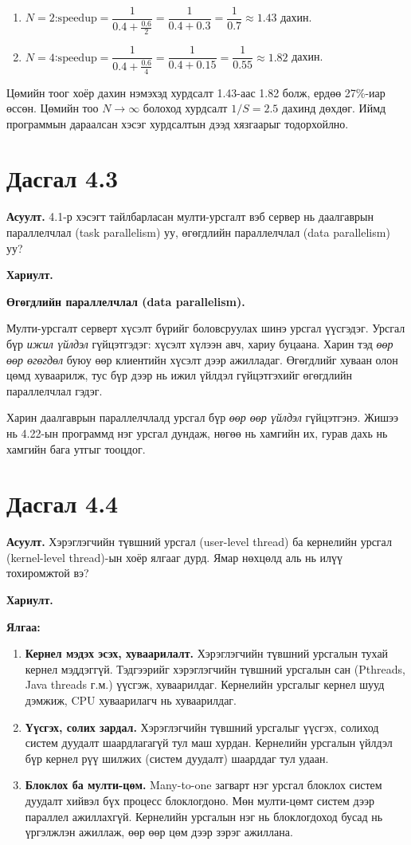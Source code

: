 \documentclass[12pt,a4paper]{article}
\newcommand{\question}[2]{\section{Дасгал #1}\textbf{Асуулт.} #2\par\medskip\textbf{Хариулт.}\par}
\begin{document}
\begin{enumerate}[label=(\alph*), leftmargin=1.5em]
  \item $N = 2$:\quad $\text{speedup} = \dfrac{1}{0.4 + \frac{0.6}{2}} = \dfrac{1}{0.4 + 0.3} = \dfrac{1}{0.7} \approx \mathbf{1.43}$ дахин.
  \item $N = 4$:\quad $\text{speedup} = \dfrac{1}{0.4 + \frac{0.6}{4}} = \dfrac{1}{0.4 + 0.15} = \dfrac{1}{0.55} \approx \mathbf{1.82}$ дахин.
\end{enumerate}

Цөмийн тоог хоёр дахин нэмэхэд хурдсалт 1.43-аас 1.82 болж, ердөө 27\%-иар өссөн. Цөмийн тоо $N \to \infty$ болоход хурдсалт $1/S = 2.5$ дахинд дөхдөг. Иймд программын дараалсан хэсэг хурдсалтын дээд хязгаарыг тодорхойлно.

\question{4.3}{4.1-р хэсэгт тайлбарласан мулти-урсгалт вэб сервер нь даалгаврын параллелчлал (task parallelism) уу, өгөгдлийн параллелчлал (data parallelism) уу?}

\textbf{Өгөгдлийн параллелчлал (data parallelism).}

Мулти-урсгалт серверт хүсэлт бүрийг боловсруулах шинэ урсгал үүсгэдэг. Урсгал бүр \emph{ижил үйлдэл} гүйцэтгэдэг: хүсэлт хүлээн авч, хариу буцаана. Харин тэд \emph{өөр өөр өгөгдөл} буюу өөр клиентийн хүсэлт дээр ажилладаг. Өгөгдлийг хуваан олон цөмд хуваарилж, тус бүр дээр нь ижил үйлдэл гүйцэтгэхийг өгөгдлийн параллелчлал гэдэг.

Харин даалгаврын параллелчлалд урсгал бүр \emph{өөр өөр үйлдэл} гүйцэтгэнэ. Жишээ нь 4.22-ын программд нэг урсгал дундаж, нөгөө нь хамгийн их, гурав дахь нь хамгийн бага утгыг тооцдог.

\question{4.4}{Хэрэглэгчийн түвшний урсгал (user-level thread) ба кернелийн урсгал (kernel-level thread)-ын хоёр ялгааг дурд. Ямар нөхцөлд аль нь илүү тохиромжтой вэ?}

\textbf{Ялгаа:}
\begin{enumerate}[leftmargin=1.5em]
  \item \textbf{Кернел мэдэх эсэх, хуваарилалт.} Хэрэглэгчийн түвшний урсгалын тухай кернел мэддэггүй. Тэдгээрийг хэрэглэгчийн түвшний урсгалын сан (Pthreads, Java threads г.м.) үүсгэж, хуваарилдаг. Кернелийн урсгалыг кернел шууд дэмжиж, CPU хуваарилагч нь хуваарилдаг.
  \item \textbf{Үүсгэх, солих зардал.} Хэрэглэгчийн түвшний урсгалыг үүсгэх, солиход систем дуудалт шаардлагагүй тул маш хурдан. Кернелийн урсгалын үйлдэл бүр кернел рүү шилжих (систем дуудалт) шаарддаг тул удаан.
  \item \textbf{Блоклох ба мулти-цөм.} Many-to-one загварт нэг урсгал блоклох систем дуудалт хийвэл бүх процесс блоклогдоно. Мөн мулти-цөмт систем дээр параллел ажиллахгүй. Кернелийн урсгалын нэг нь блоклогдоход бусад нь үргэлжлэн ажиллаж, өөр өөр цөм дээр зэрэг ажиллана.
\end{enumerate}
\end{document}
